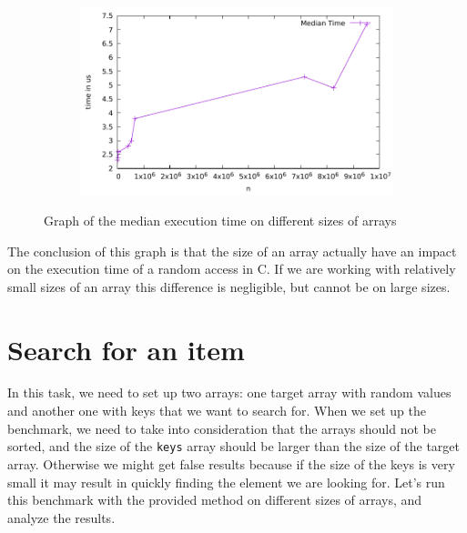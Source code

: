 \documentclass[a4paper,11pt]{article}
\begin{document}
\begin{figure}[h]
  \centering
  \begin{subfigure}[b]{.5\textwidth}
    \centering
    \includegraphics[width=\textwidth]{./median/data} %
  \end{subfigure}
  \caption{Graph of the median execution time on different sizes of arrays}
  \label{fig:graph_3}
\end{figure}

The conclusion of this graph is that the size of an array actually have an impact on the execution time of a random access in C.
If we are working with relatively small sizes of an array this difference is negligible, but cannot be on large sizes.

\section*{Search for an item}

In this task, we need to set up two arrays: one target array with random values and another one with keys that we want to search for.
When we set up the benchmark, we need to take into consideration that the arrays should not be sorted, and the size of the {\tt keys} array should be larger than the size of the target array.
Otherwise we might get false results because if the size of the keys is very small it may result in quickly finding the element we are looking for.
Let's run this benchmark with the provided method on different sizes of arrays, and analyze the results.
\end{document}
